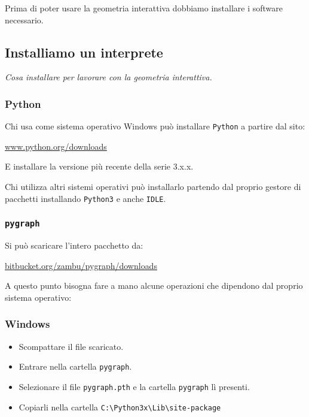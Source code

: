 Prima di poter usare la geometria interattiva dobbiamo installare i  software 
necessario.

\subsection{Installiamo un interprete}
\label{sec:05_02installazione}

\emph{Cosa installare per lavorare con la geometria interattiva.}

\subsubsection{Python}

Chi usa come sistema operativo Windows può installare \texttt{Python} 
a partire dal sito:

\url{www.python.org/downloads}

E installare la versione più recente della serie 3.x.x.

Chi utilizza altri sistemi operativi può installarlo partendo dal proprio
gestore di pacchetti installando \texttt{Python3} e anche \texttt{IDLE}.

\subsubsection{\texttt{pygraph}}

Si può scaricare l'intero pacchetto da:

\url{bitbucket.org/zambu/pygraph/downloads}

A questo punto bisogna fare a mano alcune operazioni che dipendono dal 
proprio sistema operativo:

\subsubsection*{Windows}

\begin{itemize} [noitemsep]
\item {} Scompattare il file scaricato.
\item {} Entrare nella cartella \texttt{pygraph}.
\item {} Selezionare il file \texttt{pygraph.pth} e la cartella 
  \texttt{pygraph} lì presenti.
\item {} Copiarli nella cartella 
\texttt{C:\textbackslash Python3x\textbackslash Lib\textbackslash site-package}
\end{itemize}


